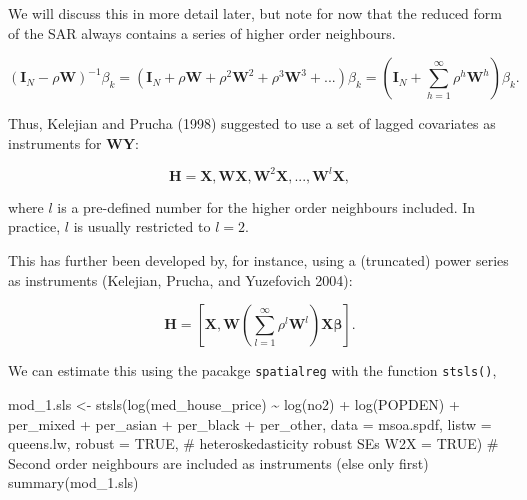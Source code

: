 \documentclass[
  letterpaper,
  DIV=11,
  numbers=noendperiod]{scrreprt}
\newenvironment{Shaded}{\begin{snugshade}}{\end{snugshade}}
\newcommand{\AttributeTok}[1]{\textcolor[rgb]{0.40,0.45,0.13}{#1}}
\newcommand{\CommentTok}[1]{\textcolor[rgb]{0.37,0.37,0.37}{#1}}
\newcommand{\ConstantTok}[1]{\textcolor[rgb]{0.56,0.35,0.01}{#1}}
\newcommand{\FunctionTok}[1]{\textcolor[rgb]{0.28,0.35,0.67}{#1}}
\newcommand{\NormalTok}[1]{\textcolor[rgb]{0.00,0.23,0.31}{#1}}
\newcommand{\OtherTok}[1]{\textcolor[rgb]{0.00,0.23,0.31}{#1}}
\newcommand{\SpecialCharTok}[1]{\textcolor[rgb]{0.37,0.37,0.37}{#1}}
\begin{document}
We will discuss this in more detail later, but note for now that the
reduced form of the SAR always contains a series of higher order
neighbours.

\[
({\boldsymbol{\mathbf{I}}_N}-\rho {\boldsymbol{\mathbf{W}}})^{-1}\beta_k 
=({\boldsymbol{\mathbf{I}}_N} + \rho{\boldsymbol{\mathbf{W}}} + \rho^2{\boldsymbol{\mathbf{W}}}^2 + \rho^3{\boldsymbol{\mathbf{W}}}^3 + ...)\beta_k 
= ({\boldsymbol{\mathbf{I}}_N} + \sum_{h=1}^\infty \rho^h{\boldsymbol{\mathbf{W}}}^h)\beta_k .
\]

Thus, Kelejian and Prucha (1998) suggested to use a set of lagged
covariates as instruments for
\(\boldsymbol{\mathbf{W}} \boldsymbol{\mathbf{Y}}\):

\[
\boldsymbol{\mathbf{H}} = \boldsymbol{\mathbf{X}}, \boldsymbol{\mathbf{W}}\boldsymbol{\mathbf{X}}, \boldsymbol{\mathbf{W}}^2\boldsymbol{\mathbf{X}}, ... , \boldsymbol{\mathbf{W}}^l\boldsymbol{\mathbf{X}},
\]

where \(l\) is a pre-defined number for the higher order neighbours
included. In practice, \(l\) is usually restricted to \(l=2\).

This has further been developed by, for instance, using a (truncated)
power series as instruments (Kelejian, Prucha, and Yuzefovich 2004):

\[
\boldsymbol{\mathbf{H}} =\left[\boldsymbol{\mathbf{X}}, \boldsymbol{\mathbf{W}}\left(\sum_{l = 1}^{\infty}\rho^{l}\boldsymbol{\mathbf{W}}^l\right)\boldsymbol{\mathbf{X}} \boldsymbol{\mathbf{\beta}}\right].
\]

We can estimate this using the pacakge \texttt{spatialreg} with the
function \texttt{stsls()},

\begin{Shaded}
\begin{Highlighting}[]
\NormalTok{mod\_1.sls }\OtherTok{\textless{}{-}} \FunctionTok{stsls}\NormalTok{(}\FunctionTok{log}\NormalTok{(med\_house\_price) }\SpecialCharTok{\textasciitilde{}} \FunctionTok{log}\NormalTok{(no2) }\SpecialCharTok{+} \FunctionTok{log}\NormalTok{(POPDEN) }\SpecialCharTok{+} 
\NormalTok{                     per\_mixed }\SpecialCharTok{+}\NormalTok{ per\_asian }\SpecialCharTok{+}\NormalTok{ per\_black }\SpecialCharTok{+}\NormalTok{ per\_other,  }
                   \AttributeTok{data =}\NormalTok{ msoa.spdf, }
                   \AttributeTok{listw =}\NormalTok{ queens.lw,}
                   \AttributeTok{robust =} \ConstantTok{TRUE}\NormalTok{, }\CommentTok{\#  heteroskedasticity robust SEs}
                   \AttributeTok{W2X =} \ConstantTok{TRUE}\NormalTok{) }\CommentTok{\# Second order neighbours are included as instruments (else only first)}
\FunctionTok{summary}\NormalTok{(mod\_1.sls)}
\end{Highlighting}
\end{Shaded}
\end{document}
